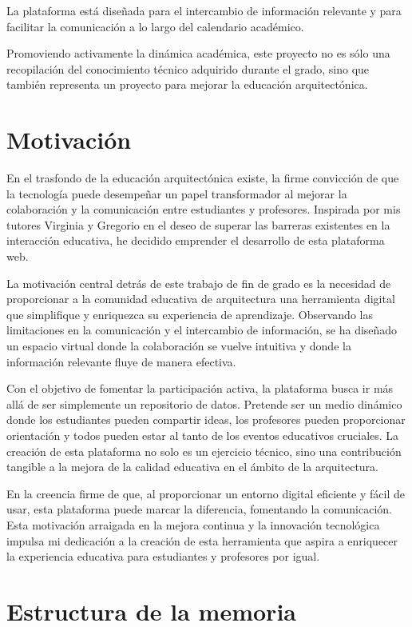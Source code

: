 \documentclass[a4paper, 12pt]{book}
\begin{document}
La plataforma está diseñada para el intercambio de información relevante y para facilitar la comunicación a 
lo largo del calendario académico.

Promoviendo activamente la dinámica académica, este proyecto no es sólo una recopilación del conocimiento técnico adquirido durante 
el grado, sino que también representa un proyecto para mejorar la educación arquitectónica. 
\section{Motivación}
\label{sec:seccion}

En el trasfondo de la educación arquitectónica existe, la firme convicción de que la tecnología puede desempeñar un papel transformador al mejorar la colaboración y la comunicación entre estudiantes y profesores. Inspirada por mis tutores Virginia y Gregorio en el deseo de superar las barreras existentes en la interacción educativa, he decidido emprender el desarrollo de esta plataforma web.

La motivación central detrás de este trabajo de fin de grado es la necesidad de proporcionar a la comunidad educativa de arquitectura una herramienta digital que simplifique y enriquezca su experiencia de aprendizaje. Observando las limitaciones en la comunicación y el intercambio de información, se ha diseñado un espacio virtual donde la colaboración se vuelve intuitiva y donde la información relevante fluye de manera efectiva.

Con el objetivo de fomentar la participación activa, la plataforma busca ir más allá de ser simplemente un repositorio de datos. Pretende ser un medio dinámico donde los estudiantes pueden compartir ideas, los profesores pueden proporcionar orientación y todos pueden estar al tanto de los eventos educativos cruciales. La creación de esta plataforma no solo es un ejercicio técnico, sino una contribución tangible a la mejora de la calidad educativa en el ámbito de la arquitectura.

En la creencia firme de que, al proporcionar un entorno digital eficiente y fácil de usar, esta plataforma puede marcar la diferencia, fomentando la comunicación. Esta motivación arraigada en la mejora continua y la innovación tecnológica impulsa mi dedicación a la creación de esta herramienta que aspira a enriquecer la experiencia educativa para estudiantes y profesores por igual.

\section{Estructura de la memoria}
\label{sec:seccion}
\end{document}
